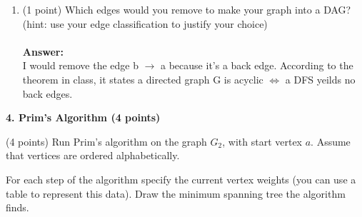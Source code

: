\documentclass[12pt]{elsart}
\begin{document}
\begin{enumerate}
\begin{enumerate}
\begin{tabular}{ |l|l|}
\hline
\end{tabular}\\
      \item (1 point) Which edges would you remove to make your graph into a DAG?  (hint: use your edge classification to justify your choice)\\\\
{\bf Answer:}\\
I would remove the edge b $\rightarrow$ a because it's a back edge. According to the theorem in class, it states a directed graph G is acyclic $\Leftrightarrow$ a DFS yeilds no back edges.\\
   \end{enumerate}

   \end{enumerate}


{\bf 4.  Prim's Algorithm (4 points)}

(4 points) Run Prim’s algorithm on the graph $G_2$, with start vertex $a$. Assume that vertices are ordered alphabetically. 

For each step of the algorithm specify the current vertex weights (you can use a table to represent this data).  Draw the minimum spanning tree the algorithm finds. 
\end{document}
